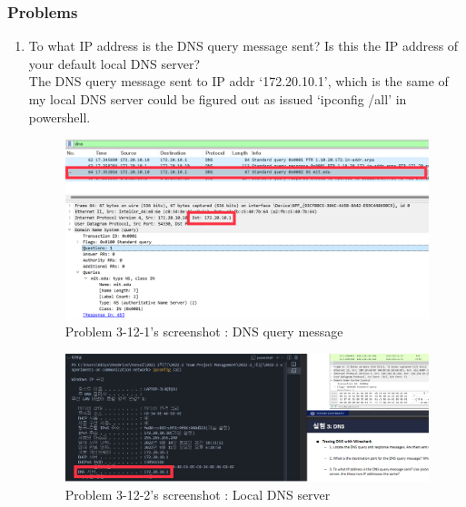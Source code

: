     \subsubsection*{Problems}
    \begin{enumerate}[label=\bfseries Problem \arabic*:,leftmargin=*,labelindent=1em]\addtocounter{enumi}{11}
        \item To what IP address is the DNS query message sent? 
        Is this the IP address of your default local DNS server?\\[0.2mm]
            \soln The DNS query message sent to IP addr ‘172.20.10.1’,
            which is the same of my local DNS server could be figured out as issued ‘ipconfig /all’ in powershell.
            \begin{figure}[!h]\centering
                \hspace{10mm} 
        		\includegraphics[width=.79\textwidth]{image/result_week01/Q3-c-1.png}
        		\caption{\footnotesize Problem 3-12-1's screenshot : DNS query message}
        		\vspace{-10pt}
            \end{figure}
            \begin{figure}[!h]\centering
                \hspace{10mm} 
        		\includegraphics[width=.79\textwidth]{image/result_week01/Q3-c-2.png}
        		\caption{\footnotesize Problem 3-12-2's screenshot : Local DNS server}
        		\vspace{-10pt}

\end{figure}
\end{enumerate}
